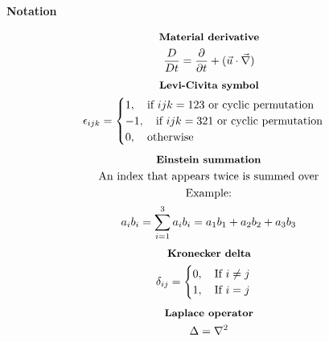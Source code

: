 \documentclass[10pt, a4paper]{article}
\newcommand{\derivative}[2]{\frac{\partial #1}{\partial #2}}
\begin{document}
\begin{center}
    \Large
    \textbf{Notation}
    \vspace{0.5cm}
\end{center}
\begin{gather*}
    \textbf{\small Material derivative} \\
    \frac{D}{Dt} = \derivative{}{t} + (\vec{u}\cdot \vec{\nabla})
\end{gather*}
\begin{gather*}
    \textbf{\small Levi-Civita symbol} \\
    \epsilon_{ijk} =
    \begin{cases}
        1, \quad \text{if $ijk = 123$ or cyclic permutation}  \\
        -1, \quad \text{if $ijk = 321$ or cyclic permutation} \\
        0, \quad \text{otherwise}
    \end{cases}
\end{gather*}
\begin{gather*}
    \textbf{\small Einstein summation} \\
    \text{An index that appears twice is summed over} \\
    \text{Example:} \\
    a_i b_i = \sum_{i=1}^3 a_i b_i = a_1 b_1 + a_2 b_2 + a_3 b_3
\end{gather*}
\begin{gather*}
    \textbf{\small Kronecker delta} \\
    \delta_{ij} =
    \begin{cases}
        0, \quad \text{If $i \neq j$} \\
        1, \quad \text{If $i = j$}
    \end{cases}
\end{gather*}
\begin{gather*}
    \textbf{\small Laplace operator} \\
    \Delta = \nabla^2
\end{gather*}
\newpage
\end{document}
